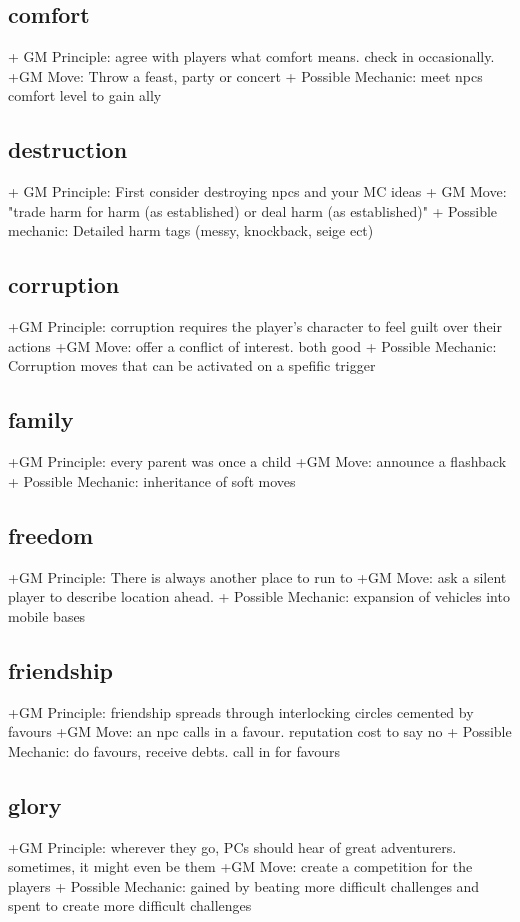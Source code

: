 \documentclass{tufte-handout}
\begin{document}
\subsection{comfort}
+ GM Principle: agree with players what comfort means. check in occasionally.
+GM Move: Throw a feast, party or concert
+ Possible Mechanic: meet npcs comfort level to gain ally

\subsection{destruction }
+ GM Principle: First consider destroying npcs and your MC ideas	
+ GM Move: "trade harm for harm (as established) or deal harm (as established)"	
+ Possible mechanic: Detailed harm tags (messy, knockback, seige ect)


\subsection{corruption}
+GM Principle: corruption requires the player's character to feel guilt over their actions	
+GM Move:  offer a conflict of interest. both good	
+ Possible Mechanic: Corruption moves that can be activated on a spefific trigger

\subsection{family}
+GM Principle: every parent was once a child
+GM Move: 	announce a flashback
+ Possible Mechanic: 	inheritance of soft moves

\subsection{freedom}
+GM Principle:  There is always another place to run to
+GM Move:  ask a silent player to describe location ahead.
+ Possible Mechanic: expansion of vehicles into mobile bases 

\subsection{friendship}
+GM Principle: friendship spreads through interlocking circles cemented by favours
+GM Move: an npc calls in a favour. reputation cost to say no 
+ Possible Mechanic: do favours, receive debts. call in for favours
		
\subsection{glory}
+GM Principle: wherever they go, PCs should hear of great adventurers. sometimes, it might even be them
+GM Move: create a competition for the players
+ Possible Mechanic: gained by beating more difficult challenges and spent to create more difficult challenges  
\end{document}
